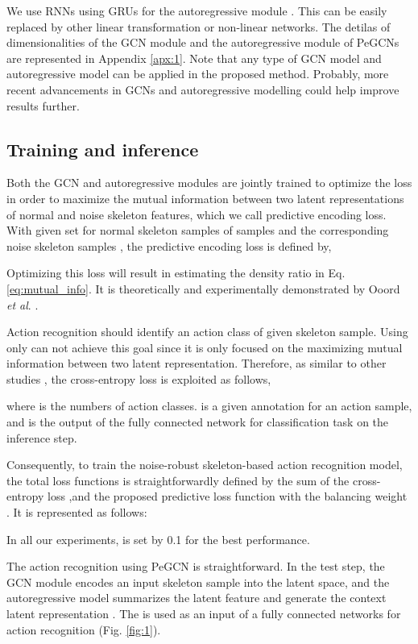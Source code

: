 \documentclass[runningheads]{llncs}
\newcommand{\etal}{\textit{et al}. }
\begin{document}
We use RNNs using GRUs \cite{chung2014empirical} for the autoregressive module . This can be easily replaced by other linear transformation or non-linear networks. The detilas of dimensionalities of the GCN module and the autoregressive module of PeGCNs are represented in Appendix \ref{apx:1}. Note that any type of GCN model and autoregressive model can be applied in the proposed method. Probably, more recent advancements in GCNs and autoregressive modelling could help improve results further. 

\subsection{Training and inference}
Both the GCN and autoregressive modules are jointly trained to optimize the loss in order to maximize the mutual information between two latent representations of normal and noise skeleton features, which we call predictive encoding loss. With given set for normal skeleton samples  of  samples and the corresponding noise skeleton samples , the predictive encoding loss is defined by,

Optimizing this loss will result in  estimating the density ratio in Eq. \ref{eq:mutual_info}. It is theoretically and experimentally demonstrated by Ooord \etal \cite{oord2018representation}.

Action recognition should identify an action class of given skeleton sample. Using   only can not achieve this goal since it is only focused on the maximizing mutual information between two latent representation. Therefore, as similar to other studies \cite{shi2019two,song2019richly,shi2019multi}, the cross-entropy loss is exploited as follows, 

where  is the numbers of action classes.  is a given annotation for an action sample, and  is the output of the fully connected network for classification task on the inference step. 

Consequently, to train the noise-robust skeleton-based action recognition model, the total loss functions is straightforwardly defined by the sum of the cross-entropy loss  ,and the proposed predictive loss function with the balancing weight . It is represented as follows:

In all our experiments,  is set by 0.1 for the best performance. 

The action recognition using PeGCN is straightforward. In the test step, the GCN module  encodes an input skeleton sample into the latent space, and the autoregressive model  summarizes the latent feature and generate the context latent representation . The  is used as an input of a fully connected networks for action recognition (Fig. \ref{fig:1}).
\end{document}
